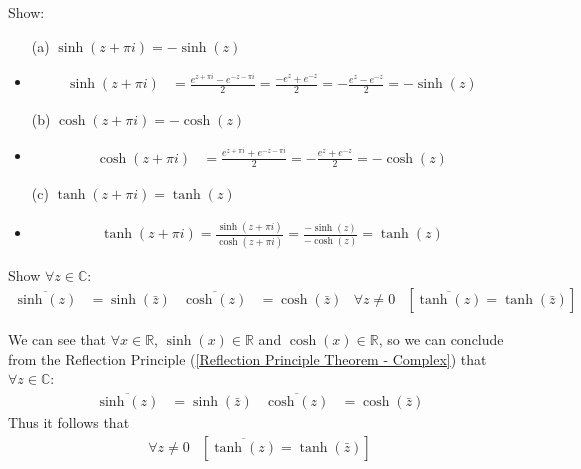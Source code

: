 \documentclass[12pt, english]{book}
\makeatletter
\renewenvironment{proof}[1][\proofname]{\par
	\pushQED{\qed}%
	\normalfont \topsep6\p@\@plus6\p@\relax
	\list{}{%
		\settowidth{\leftmargin}{\itshape\proofname:\hskip\labelsep}%
		\setlength{\labelwidth}{0pt}%
		\setlength{\itemindent}{-\leftmargin}%
		}%
	\item[\hskip\labelsep\itshape#1\@addpunct{:}]\ignorespaces
	}{\popQED\endlist\@endpefalse}
\makeatother
\begin{document}
	\begin{example}
		Show: 
		\begin{itemize}
			\item[(a)] \(\sinh(z + \pi i) = -\sinh(z)\)
			\begin{proof}
				{\color{Grey}
					\begin{align*}
						\sinh(z + \pi i) 
						&= \frac{e^{z + \pi i} - e^{-z - \pi i}}{2}
						 = \frac{-e^z + e^{-z}}{2}
						 = -\frac{e^z - e^{-z}}{2} = -\sinh(z)
					\end{align*}
				}
			\end{proof}
			\item[(b)] \(\cosh(z + \pi i) = - \cosh(z) \)
			\begin{proof}
				{\color{Grey}
				\begin{align*}
					\cosh(z + \pi i) 
					&= \frac{e^{z + \pi i} + e^{-z - \pi i}}{2} 
					 = -\frac{e^z + e^{-z}}{2} = -\cosh(z)
				\end{align*}
				}
			\end{proof}
			\item[(c)] \(\tanh(z + \pi i) = \tanh(z)\)
			\begin{proof}
				{\color{Grey}
				\begin{align*}
					\tanh(z + \pi i) = \frac{\sinh(z + \pi i)}{\cosh(z + \pi i)} = \frac{-\sinh(z)}{-\cosh(z)} = \tanh(z)
				\end{align*}
				}
			\end{proof}
		\end{itemize}
	\end{example}
	
	\begin{example}
		Show \(\forall z \in \mathbb{C}\):
		\begin{align*}
			\overline{\sinh(z)} &= \sinh(\bar{z}) & \overline{\cosh(z)} &= \cosh(\bar{z}) &
			\forall z \neq 0 &\left[\overline{\tanh(z)} = \tanh(\bar{z})\right]
		\end{align*}
		\begin{proof}
		{\color{Grey}
			We can see that \(\forall x \in \mathbb{R}\), \(\sinh(x) \in \mathbb{R}\) and \(\cosh(x) \in \mathbb{R}\), so we can conclude from the Reflection Principle (\cref{Reflection Principle Theorem - Complex}) that \(\forall z \in \mathbb{C}\):
			\begin{align*}
				\overline{\sinh(z)} &= \sinh(\bar{z}) & \overline{\cosh(z)} &= \cosh(\bar{z})
			\end{align*}
			Thus it follows that 
			\begin{align*}
				\forall z \neq 0 &\left[\overline{\tanh(z)} = \tanh(\bar{z})\right]
			\end{align*}
		}
		\end{proof}
	\end{example}
	
\end{document}
